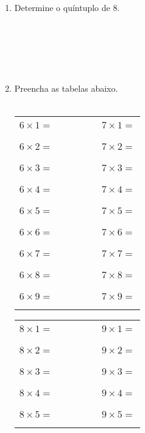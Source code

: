 \documentclass[a4paper,14pt]{article}
\begin{document}
\begin{multicols}{2}
\begin{enumerate}
    		\item Determine o quíntuplo de 8. \\\\\\\\\\\\
    		\item Preencha as tabelas abaixo. \\\\
    		\begin{tabular}{ccc}
    			$6 \times 1 = $ & ~~~~~~ & $7 \times 1 = $ \\\\
    			$6 \times 2 = $ & ~~~~~~ & $7 \times 2 = $  \\\\
    			$6 \times 3 = $	 & ~~~~~~ & $7 \times 3 = $  \\\\
    			$6 \times 4 = $ & ~~~~~~ & $7 \times 4 = $ \\\\
    			$6 \times 5 = $ & ~~~~~~ & $7 \times 5 = $  \\\\
    			$6 \times 6 = $	 & ~~~~~~ & $7 \times 6 = $  \\\\
    			$6 \times 7 = $ & ~~~~~~ & $7 \times 7 = $ \\\\
    			$6 \times 8 = $ & ~~~~~~ & $7 \times 8 = $  \\\\
    			$6 \times 9 = $	 & ~~~~~~ & $7 \times 9 = $  \\\\
    		\end{tabular} \newpage
    		\begin{tabular}{ccc}
    			$8 \times 1 = $ & ~~~~~~ & $9 \times 1 = $ \\\\
    			$8 \times 2 = $ & ~~~~~~ & $9 \times 2 = $  \\\\
    			$8 \times 3 = $	 & ~~~~~~ & $9 \times 3 = $  \\\\
    			$8 \times 4 = $ & ~~~~~~ & $9 \times 4 = $ \\\\
    			$8 \times 5 = $ & ~~~~~~ & $9 \times 5 = $  \\\\

\end{tabular}
\end{enumerate}
\end{multicols}
\end{document}
